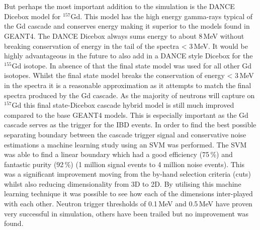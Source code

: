 \\\\But perhaps the most important addition to the simulation is the DANCE Dicebox model for $^{157}$Gd. This model has the high energy gamma-rays typical of the Gd cascade and conserves energy making it superior to the models found in GEANT4. The DANCE Dicebox always sums energy to about 8\,MeV without breaking conservation of energy in the tail of the spectra < 3\,MeV. It would be highly advantageous in the future to also add in a DANCE style Dicebox for the $^{155}$Gd isotope. In absence of that the final state model was used for all other Gd isotopes. Whilst the final state model breaks the conservation of energy < 3\,MeV in the spectra it is a reasonable approximation as it attempts to match the final spectra produced by the Gd cascade. As the majority of neutrons will capture on $^{157}$Gd \cite{Abdushukurov_2010} this final state-Dicebox cascade hybrid model is still much improved compared to the base GEANT4 models. This is especially important as the Gd cascade serves as the trigger for the IBD events. In order to find the best possible separating boundary between the cascade trigger signal and conservative noise estimations a machine learning study using an SVM was performed. The SVM was able to find a linear boundary which had a good efficiency (75\,\%) and fantastic purity (92\,\%) (1 million signal events to 4 million noise events). This was a significant improvement moving from the by-hand selection criteria (cuts) whilst also reducing dimensionality from 3D to 2D. By utilising this machine learning technique it was possible to see how each of the dimensions inter-played with each other. Neutron trigger thresholds of 0.1\,MeV and 0.5\,MeV have proven very successful in simulation, others have been trailed but no improvement was found. 
